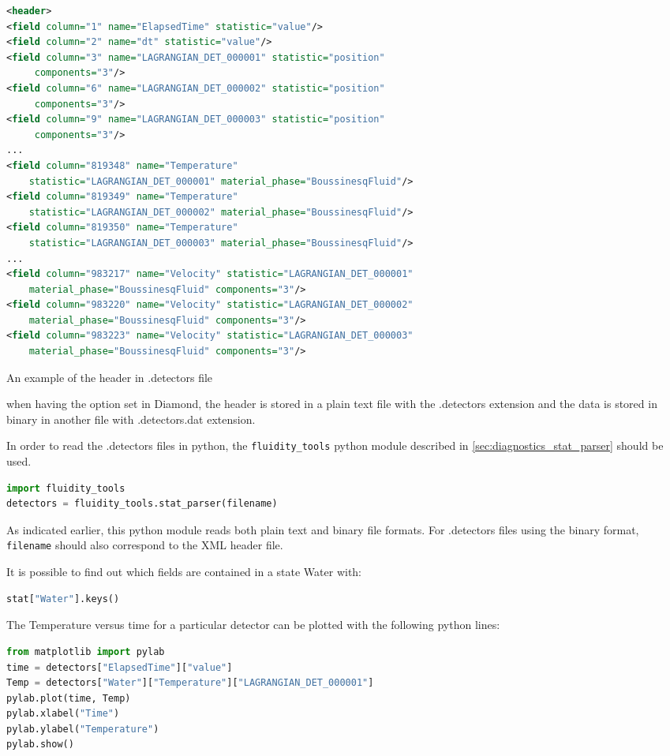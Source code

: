 \begin{example}
\begin{lstlisting}[language = XML]
<header>
<field column="1" name="ElapsedTime" statistic="value"/>
<field column="2" name="dt" statistic="value"/>
<field column="3" name="LAGRANGIAN_DET_000001" statistic="position"
     components="3"/>
<field column="6" name="LAGRANGIAN_DET_000002" statistic="position"
     components="3"/>
<field column="9" name="LAGRANGIAN_DET_000003" statistic="position"
     components="3"/>
...
<field column="819348" name="Temperature"
    statistic="LAGRANGIAN_DET_000001" material_phase="BoussinesqFluid"/>
<field column="819349" name="Temperature"
    statistic="LAGRANGIAN_DET_000002" material_phase="BoussinesqFluid"/>
<field column="819350" name="Temperature"
    statistic="LAGRANGIAN_DET_000003" material_phase="BoussinesqFluid"/>
...
<field column="983217" name="Velocity" statistic="LAGRANGIAN_DET_000001"
    material_phase="BoussinesqFluid" components="3"/>
<field column="983220" name="Velocity" statistic="LAGRANGIAN_DET_000002"
    material_phase="BoussinesqFluid" components="3"/>
<field column="983223" name="Velocity" statistic="LAGRANGIAN_DET_000003"
    material_phase="BoussinesqFluid" components="3"/>
\end{lstlisting}

\caption{An example of the header in .detectors file}
\label{header_det}
\end{example}

when having the  option set in Diamond, the header is stored in a plain text file with the .detectors extension and the data is stored in binary in another file with .detectors.dat extension.

In order to read the .detectors files in python, the \lstinline[language = Python]*fluidity_tools* python module described in \ref{sec:diagnostics_stat_parser} should be used.

\begin{lstlisting}[language = Python]
import fluidity_tools
detectors = fluidity_tools.stat_parser(filename)
\end{lstlisting}

As indicated earlier, this python module reads both
plain text and binary file formats. For .detectors files using the binary
format, \lstinline[language = Python]*filename* should also correspond to the XML header file.

It is possible to find out which fields are contained in a state Water with:

\begin{lstlisting}[language=Python]
stat["Water"].keys()
\end{lstlisting}

The Temperature versus time for a particular detector can be plotted with the following python lines:

\begin{lstlisting}[language=Python]
from matplotlib import pylab
time = detectors["ElapsedTime"]["value"]
Temp = detectors["Water"]["Temperature"]["LAGRANGIAN_DET_000001"]
pylab.plot(time, Temp)
pylab.xlabel("Time")
pylab.ylabel("Temperature")
pylab.show()
\end{lstlisting}
